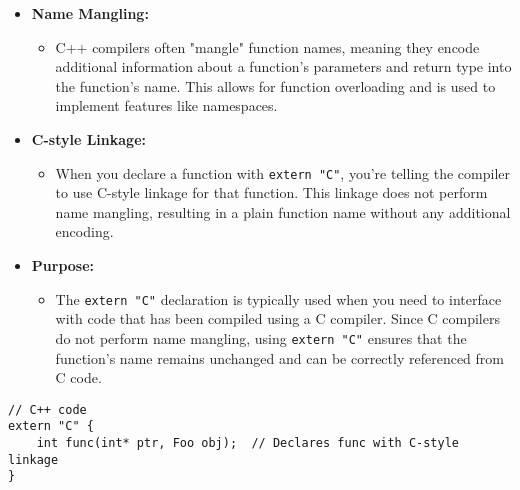 \begin{itemize}
    \item \textbf{Name Mangling:}
    \begin{itemize}
        \item C++ compilers often "mangle" function names, meaning they encode additional information about a function's parameters and return type into the function's name. This allows for function overloading and is used to implement features like namespaces.
    \end{itemize}
    
    \item \textbf{C-style Linkage:}
    \begin{itemize}
        \item When you declare a function with \texttt{extern "C"}, you're telling the compiler to use C-style linkage for that function. This linkage does not perform name mangling, resulting in a plain function name without any additional encoding.
    \end{itemize}
    
    \item \textbf{Purpose:}
    \begin{itemize}
        \item The \texttt{extern "C"} declaration is typically used when you need to interface with code that has been compiled using a C compiler. Since C compilers do not perform name mangling, using \texttt{extern "C"} ensures that the function's name remains unchanged and can be correctly referenced from C code.
    \end{itemize}
\end{itemize}

\begin{tcolorbox}[title=Extern C]
\begin{verbatim}
// C++ code
extern "C" {
    int func(int* ptr, Foo obj);  // Declares func with C-style linkage
}
\end{verbatim}
\end{tcolorbox}
